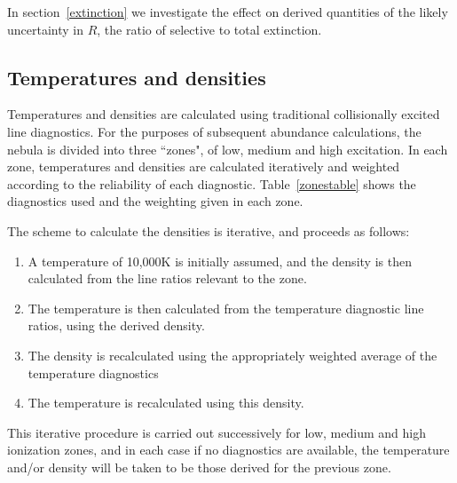 \documentclass[useAMS,usenatbib]{mn2e}
\begin{document}
In section~\ref{extinction} we investigate the effect on derived quantities of the likely uncertainty in $R$, the ratio of selective to total extinction.

\subsection{Temperatures and densities}

Temperatures and densities are calculated using traditional collisionally excited line diagnostics.  For the purposes of subsequent abundance calculations, the nebula is divided into three ``zones", of low, medium and high excitation.  In each zone, temperatures and densities are calculated iteratively and weighted according to the reliability of each diagnostic.  Table~\ref{zonestable} shows the diagnostics used and the weighting given in each zone.

The scheme to calculate the densities is iterative, and proceeds as follows:

\begin{enumerate}
\item A temperature of 10,000K is initially assumed, and the density is then calculated from the line ratios relevant to the zone.
\item The temperature is then calculated from the temperature diagnostic line ratios, using the derived density.
\item The density is recalculated using the appropriately weighted average of the temperature diagnostics
\item The temperature is recalculated using this density.
\end{enumerate}

This iterative procedure is carried out successively for low, medium and high ionization zones, and in each case if no diagnostics are available, the temperature and/or density will be taken to be those derived for the previous zone.
\end{document}
